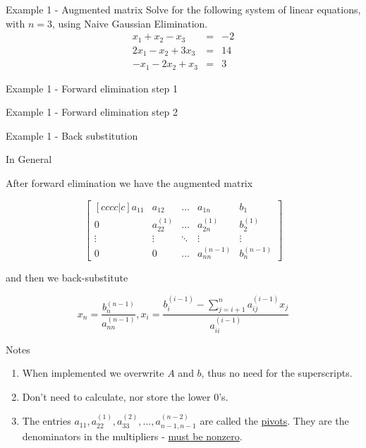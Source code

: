 \documentclass[12pt]{beamer}
\begin{document}
\begin{frame}{Example 1 - Augmented matrix}
Solve for the following system of linear equations, with $n=3$, using Naive Gaussian Elimination.
\begin{eqnarray*}
x_1+x_2-x_3 &=& -2\\
2x_1-x_2+3x_3 &=& 14 \\
-x_1-2x_2+x_3 &=& 3
\end{eqnarray*}
\vspace{3 in}
\end{frame}

\begin{frame}{Example 1 - Forward elimination step 1}

\end{frame}

\begin{frame}{Example 1 - Forward elimination step 2}

\end{frame}

\begin{frame}{Example 1 - Back substitution}

\end{frame}


\begin{frame}{In General}

After forward elimination we have the augmented matrix

\[
\begin{bmatrix}[cccc|c]
    a_{11}       & a_{12} & \dots & a_{1n} & b_1 \\
    0       & a_{22}^{(1)} & \dots & a_{2n}^{(1)} & b_2^{(1)} \\
    \vdots & \vdots & \ddots & \vdots & \vdots \\
    0       & 0 & \dots & a_{nn}^{(n-1)} & b_n^{(n-1)}
\end{bmatrix}
\]

and then we back-substitute

\[
x_n = \frac{b_n^{(n-1)}}{a_{nn}^{(n-1)}}, x_i = \frac{b_i^{(i-1)} - \sum_{j=i+1}^{n} a_{ij}^{(i-1)}x_j}{a_{ii}^{(i-1)}}
\]

\end{frame}

\begin{frame}{Notes}
\begin{enumerate}
\item{When implemented we overwrite $A$ and $b$, thus no need for the superscripts.}
\item{Don't need to calculate, nor store the lower $0$'s.}
\item{The entries $a_{11}, a_{22}^{(1)}, a_{33}^{(2)}, ..., a_{n-1,n-1}^{(n-2)}$ are called the \underline{pivots}. 
They are the denominators in the multipliers - \underline{must be nonzero}}.
\end{enumerate}
\end{frame}
\end{document}

